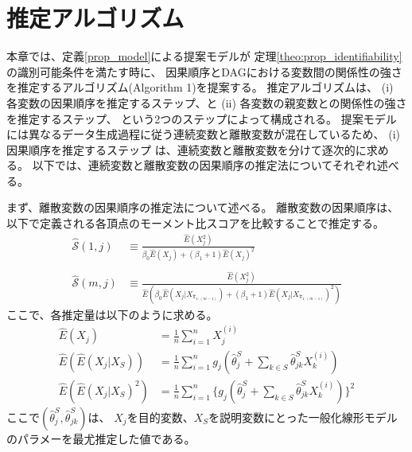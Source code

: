 
\section{推定アルゴリズム}
\label{part:algorithm}

本章では、定義\ref{prop_model}による提案モデルが
定理\ref{theo:prop_identifiability}の識別可能条件を満たす時に、
因果順序とDAGにおける変数間の関係性の強さを推定するアルゴリズム(Algorithm 1)を提案する。
推定アルゴリズムは、
(i) 各変数の因果順序を推定するステップ、と
(ii) 各変数の親変数との関係性の強さを推定するステップ、
という2つのステップによって構成される。
提案モデルには異なるデータ生成過程に従う連続変数と離散変数が混在しているため、
(i)因果順序を推定するステップ は、連続変数と離散変数を分けて逐次的に求める。
以下では、連続変数と離散変数の因果順序の推定法についてそれぞれ述べる。

まず、離散変数の因果順序の推定法について述べる。
離散変数の因果順序は、以下で定義される各頂点のモーメント比スコアを比較することで推定する。
\begin{equation}
  \begin{split}
    \widehat{\mathcal S}(1,j) &\equiv
          \frac{\widehat{E}(X_j^2)}{\beta_0 \widehat{E}(X_j) + (\beta_1 + 1)\widehat{E}(X_j)^2} \\
          \\
    \widehat{\mathcal S}(m,j) &\equiv
          \frac{\widehat{E}(X_j^2)}
          {\widehat{E}(\beta_0 \widehat{E}(X_j | X_{\widehat{\pi}_{1:(m-1)}}) +
          (\beta_1 + 1)\widehat{E}(X_j | X_{\widehat{\pi}_{1:(m-1)}})^2)}
  \end{split}
  \label{alg:MRS}
\end{equation}
ここで、各推定量は以下のように求める。
\begin{align*}
  \widehat{E}(X_j)
      &= \tfrac{1}{n}\textstyle \sum_{i=1}^n X_j^{(i)} \\
  \widehat{E}(\widehat{E}(X_j | X_S))
      &= \tfrac{1}{n}\textstyle \sum_{i=1}^n g_j(\widehat{\theta}_j^S +
         \textstyle \sum_{k\in S} \widehat{\theta}_{jk}^S X_k^{(i)}) \\
  \widehat{E}(\widehat{E}(X_j | X_S)^2)
      &= \tfrac{1}{n}\textstyle \sum_{i=1}^n \{g_j(\widehat{\theta}_j^S +
         \textstyle \sum_{k\in S} \widehat{\theta}_{jk}^S X_k^{(i)})\}^2
\end{align*}
ここで$(\widehat{\theta}_j^S, \widehat{\theta}_{jk}^S)$は、
$X_j$を目的変数、$X_S$を説明変数にとった一般化線形モデルのパラメーを最尤推定した値である。

